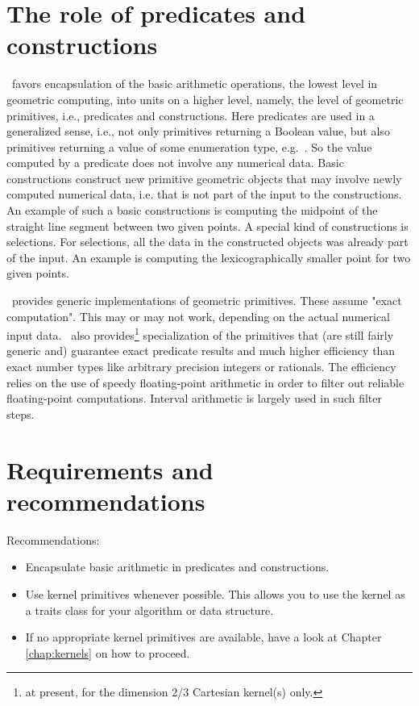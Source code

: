 

\section{The role of predicates and constructions}
\cgal\ favors encapsulation of the basic arithmetic operations, the lowest
level in geometric computing, into units on a higher level, namely,
the level of geometric primitives, i.e., predicates and constructions. 
Here predicates are used in a generalized sense, i.e., not only primitives 
returning a Boolean value, but also primitives returning a value of 
some enumeration type, e.g.\ . So the value computed
by a predicate does not involve any numerical data. Basic constructions 
construct new primitive geometric objects that may involve newly computed
numerical data, i.e. that is not part of the input to the constructions. 
An example of such a basic constructions is computing the midpoint of
the straight line segment between two given points.
A special kind of constructions is selections. For selections, all the data
in the constructed objects was already part of the input. An example is
computing the lexicographically smaller point for two given points.

\cgal\ provides generic implementations of geometric primitives. These assume
"exact computation". This may or may not work, depending on the actual
numerical input data. \cgal\ also provides\footnote{at present, for the 
dimension 2/3 Cartesian kernel(s) only.}
specialization of the primitives
that (are still fairly generic and) guarantee exact predicate results and
much higher efficiency than exact number types like arbitrary precision
integers or rationals. The efficiency relies on the use of speedy 
floating-point arithmetic in order to filter out reliable floating-point 
computations. Interval arithmetic is largely used in such filter steps.

\section{Requirements and recommendations}

Recommendations:
\begin{itemize}
\item Encapsulate basic arithmetic in predicates and constructions.
\item Use kernel primitives whenever possible. This allows you to use 
the kernel as a traits class for your algorithm or data structure.
\item If no appropriate kernel primitives are available, have a look at
Chapter \ref{chap:kernels} on how to proceed.
\end{itemize}

